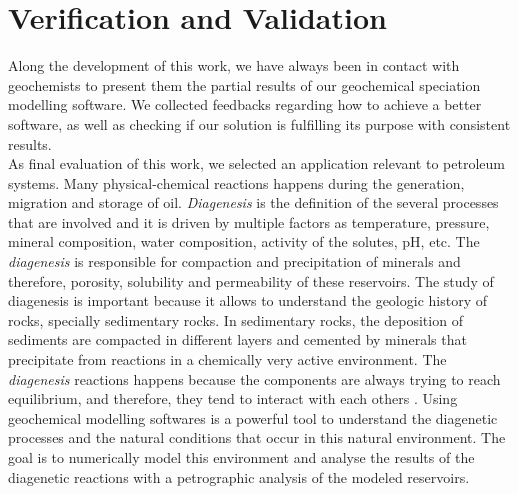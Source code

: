 \documentclass[ppgc,mestrado,English]{iiufrgs}
\begin{document}


\chapter{Verification and Validation}

Along the development of this work, we have always been in contact with geochemists to present them the partial results of our geochemical speciation modelling software. We collected feedbacks regarding how to achieve a better software, as well as checking if our solution is fulfilling its purpose with consistent results. \\
As final evaluation of this work, we selected an application relevant to petroleum systems. Many physical-chemical reactions happens during the generation, migration and storage of oil. \emph{Diagenesis} is the definition of the several processes that are involved and it is driven by multiple factors as temperature, pressure, mineral composition, water composition, activity of the solutes, pH, etc. 
The \emph{diagenesis} is responsible for compaction and precipitation of minerals \cite{Tucker:01} and therefore, porosity, solubility and permeability of these reservoirs. The study of diagenesis is important because it allows to understand the geologic history of rocks, specially sedimentary rocks. In sedimentary rocks, the deposition of sediments are compacted in different layers and cemented by minerals that precipitate from reactions in a chemically very active environment. The \emph{diagenesis} reactions happens because the components are always trying to reach equilibrium, and therefore, they tend to interact with each others \cite{Burley:85}.
Using geochemical modelling softwares is a powerful tool to understand the diagenetic processes and the natural conditions that occur in this natural environment. The goal is to numerically model this environment and analyse the results of the diagenetic reactions with a petrographic analysis of the modeled reservoirs.
\end{document}
